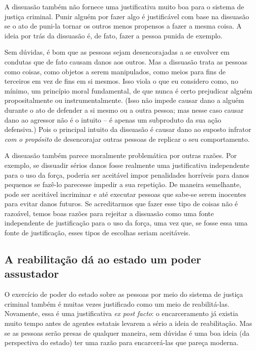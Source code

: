 A dissuasão também não fornece uma justificativa muito boa para o sistema de justiça criminal. Punir alguém por fazer algo é justificável com base na dissuasão se o ato de puni-la tornar os outros menos propensos a fazer a mesma coisa. A ideia por trás da dissuasão é, de fato, fazer a pessoa punida de exemplo.

Sem dúvidas, é bom que as pessoas sejam desencorajadas a se envolver em condutas que de fato causam danos aos outros. Mas a dissuasão trata as pessoas como coisas, como objetos a serem manipulados, como meios para fins de terceiros em vez de fins em si mesmos. Isso viola o que eu considero como, no mínimo, um princípio moral fundamental, de que nunca é certo prejudicar alguém propositalmente ou instrumentalmente. (Isso não impede causar dano a alguém durante o ato de defender a si mesmo ou a outra pessoa; mas nesse caso causar dano ao agressor não é o intuito -- é apenas um subproduto da sua ação defensiva.) Pois o principal intuito da dissuasão é causar dano ao suposto infrator \emph{com o propósito} de desencorajar outras pessoas de replicar o seu comportamento.

A dissuasão também parece moralmente problemática por outras razões. Por exemplo, se dissuadir sérios danos fosse realmente uma justificativa independente para o uso da força, poderia ser aceitável impor penalidades horríveis para danos pequenos se fazê-lo parecesse impedir a sua repetição. De maneira semelhante, pode ser aceitável incriminar e até executar pessoas que sabe-se serem inocentes para evitar danos futuros. Se acreditarmos que fazer esse tipo de coisas não é razoável, temos boas razões para rejeitar a dissuasão como uma fonte independente de justificação para o uso da força, uma vez que, se fosse essa uma fonte de justificação, esses tipos de escolhas seriam aceitáveis.

\subsection*{A reabilitação dá ao estado um poder assustador}

O exercício de poder do estado sobre as pessoas por meio do sistema de justiça criminal também é muitas vezes justificado como um meio de reabilitá-las. Novamente, essa é uma justificativa \emph{ex post facto}: o encarceramento já existia muito tempo antes de agentes estatais levarem a sério a ideia de reabilitação. Mas se as pessoas serão presas de qualquer maneira, sem dúvidas é uma boa ideia (da perspectiva do estado) ter uma razão para encarcerá-las que pareça moderna.

